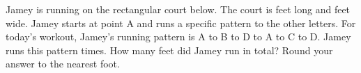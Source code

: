 Jamey is running on the rectangular court below. The court is  feet long and  feet wide. Jamey starts at point A and runs a specific pattern to the other letters. For today’s workout, Jamey’s running pattern is A to B to D to A to C to D. Jamey runs this pattern  times. How many feet did Jamey run in total? Round your answer to the nearest foot.  
\newline
{}